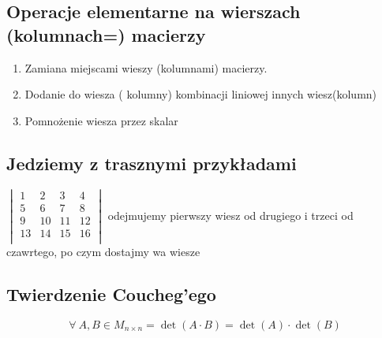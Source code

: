 \documentclass[11pt]{article}
\begin{document}
 \subsection{Operacje elementarne na wierszach (kolumnach=) macierzy}
 \begin{enumerate}
 \item{Zamiana miejscami wieszy (kolumnami) macierzy.}
 \item{Dodanie do wiesza ( kolumny) kombinacji liniowej innych wiesz(kolumn)}
 \item{Pomnożenie wiesza przez skalar}
 \end{enumerate}
 \subsection{Jedziemy  z trasznymi przykładami}
$\begin{vmatrix}
	1 & 2 & 3 & 4\\
	5 & 6 & 7 & 8\\
	9 & 10 & 11 & 12\\
	13 & 14 & 15 & 16\\
\end{vmatrix}$ odejmujemy pierwszy wiesz od drugiego i trzeci od czawrtego, po czym dostajmy wa wiesze 
\subsection{Twierdzenie Coucheg'ego}
$$ \forall\ A,B \in M_{n\times n} = \det(A \cdot B) = \det{(A)} \cdot \det{(B)} $$
\end{document}
